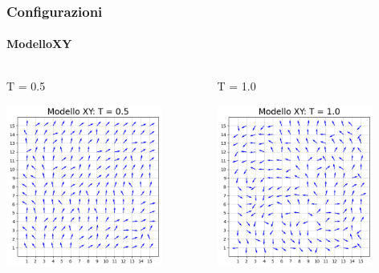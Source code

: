 \begin{frame}
    \frametitle{Configurazioni}
    \framesubtitle{ModelloXY}

    \begin{columns}
        \begin{column}{0.5\textwidth}
            \begin{block}{T = 0.5}

            \centering
            \includegraphics[width=0.8\textwidth]{Immagini/simXY/conf_T0.5.png}

            \end{block}
        \end{column}
    
        \begin{column}{0.5\textwidth}
            \begin{block}{T = 1.0}

                \centering
                \includegraphics[width=0.8\textwidth]{Immagini/backupXY/conf_T1.0.png}


\end{block}
\end{column}
\end{columns}
\end{frame}
